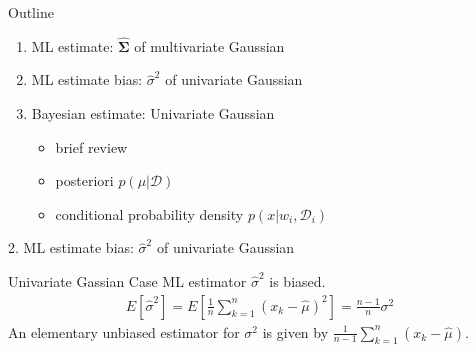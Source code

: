 \documentclass[compress,blue]{beamer}
\newcommand{\bSig}{\mathbf{\Sigma}}
\newcommand{\calD}{\mathcal{D}}
\begin{document}
\begin{frame}{Outline}
	\begin{enumerate}
		\item<1-> ML estimate: $\hat{\bSig}$ of multivariate Gaussian 
		\vspace{0.1in}
		\item<2-> ML estimate bias: $\hat{\sigma}^2$ of univariate Gaussian
		\vspace{0.1in}
		\item<0> Bayesian estimate: Univariate Gaussian
		\begin{itemize}
			\item brief review
			\item posteriori $p(\mu|\calD)$
			\item conditional probability density $p(x | w_i, \calD_i)$
		\end{itemize}
	\end{enumerate}
\end{frame}

\begin{frame}{2. ML estimate bias: $\hat{\sigma}^2$ of univariate Gaussian}
	\begin{block}{Univariate Gassian Case}
		ML estimator $\hat{\sigma}^2$ is biased.
		\begin{align}
			E[\hat{\sigma}^2] = E[\frac{1}{n}\sum_{k=1}^{n}(x_k-\hat{\mu})^2] = \frac{n-1}{n}\sigma^2
		\end{align}
		\small
		An elementary unbiased estimator for $\sigma^2$ is given by $\frac{1}{n-1}\sum_{k=1}^n(x_k - \hat{\mu})$.
		\normalsize
	\end{block}	
\end{frame}
\end{document}
